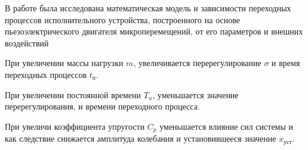 \documentclass[a4paper, 12pt]{article}
\begin{document}
В работе была исследована математическая модель и зависимости переходных процессов исполнительного устройства, построенного на основе пьезоэлектрического двигателя микроперемещений, от его параметров и внешних воздействий\par
При увеличении массы нагрузки $m$, увеличивается перерегулирование $\sigma$ и время переходных процессов $t_\text{п}$. \par
При увеличении постоянной времени $T_u$, уменьшается значение перерегулирования, и времени переходного процесса. \par
При увеличи коэффициента упругости $C_p$ уменьшается влияние сил системы и как следствие снижается амплитуда колебания и установившееся значение $x_\text{уст}$.
\end{document}
